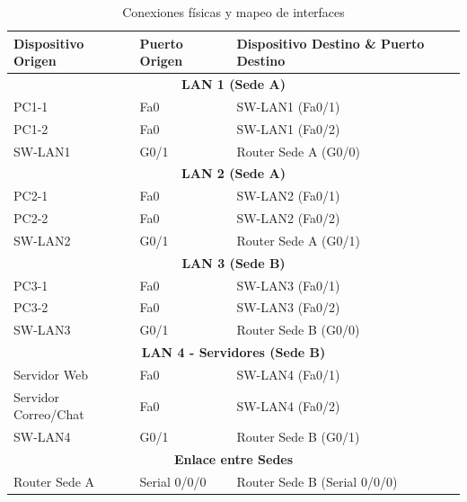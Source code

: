 \begin{table}[H]
\centering
\caption{Conexiones físicas y mapeo de interfaces}
\label{tab:conexiones}
\begin{tabularx}{\textwidth}{l l l}
\toprule
Dispositivo Origen & Puerto Origen & Dispositivo Destino \& Puerto Destino \\
\midrule
\multicolumn{3}{c}{\textbf{LAN 1 (Sede A)}} \\
\midrule
PC1-1 & Fa0 & SW-LAN1 (Fa0/1) \\
PC1-2 & Fa0 & SW-LAN1 (Fa0/2) \\
SW-LAN1 & G0/1 & Router Sede A (G0/0) \\
\midrule
\multicolumn{3}{c}{\textbf{LAN 2 (Sede A)}} \\
\midrule
PC2-1 & Fa0 & SW-LAN2 (Fa0/1) \\
PC2-2 & Fa0 & SW-LAN2 (Fa0/2) \\
SW-LAN2 & G0/1 & Router Sede A (G0/1) \\
\midrule
\multicolumn{3}{c}{\textbf{LAN 3 (Sede B)}} \\
\midrule
PC3-1 & Fa0 & SW-LAN3 (Fa0/1) \\
PC3-2 & Fa0 & SW-LAN3 (Fa0/2) \\
SW-LAN3 & G0/1 & Router Sede B (G0/0) \\
\midrule
\multicolumn{3}{c}{\textbf{LAN 4 - Servidores (Sede B)}} \\
\midrule
Servidor Web & Fa0 & SW-LAN4 (Fa0/1) \\
Servidor Correo/Chat & Fa0 & SW-LAN4 (Fa0/2) \\
SW-LAN4 & G0/1 & Router Sede B (G0/1) \\
\midrule
\multicolumn{3}{c}{\textbf{Enlace entre Sedes}} \\
\midrule
Router Sede A & Serial 0/0/0 & Router Sede B (Serial 0/0/0) \\
\bottomrule
\end{tabularx}
\end{table}